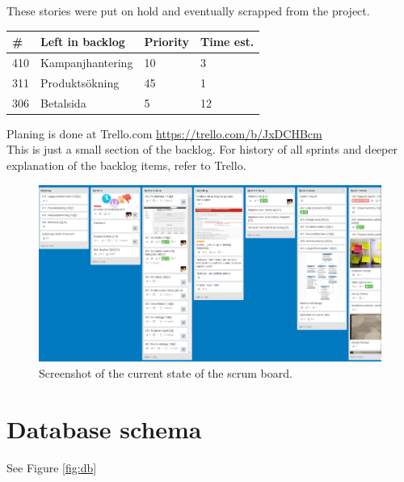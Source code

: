 \documentclass[paper=a4, fontsize=11pt]{report} %
\begin{document}
	These stories were put on hold and eventually scrapped from the project.

	\begin{tabular}{|l|l|l|l|}
		\hline
		\#  & Left in backlog  & Priority & Time est. \\ \hline
		410 & Kampanjhantering & 10       & 3         \\ \hline
		311 & Produktsökning   & 45       & 1         \\ \hline
		306 & Betalsida        & 5        & 12        \\ \hline
	\end{tabular}

	Planing is done at Trello.com
	\url{https://trello.com/b/JxDCHBcm} \\
	This is just a small section of the backlog. For history of all sprints and deeper
	explanation of the backlog items, refer to Trello.

	\begin{figure}[h]
		\includegraphics[width=\textwidth]{artifacts/trello_final.png}
		\caption{Screenshot of the current state of the scrum board.}
		\label{fig:trello_final}
	\end{figure}

\section*{Database schema}
See Figure \ref{fig:db}
\end{document}
